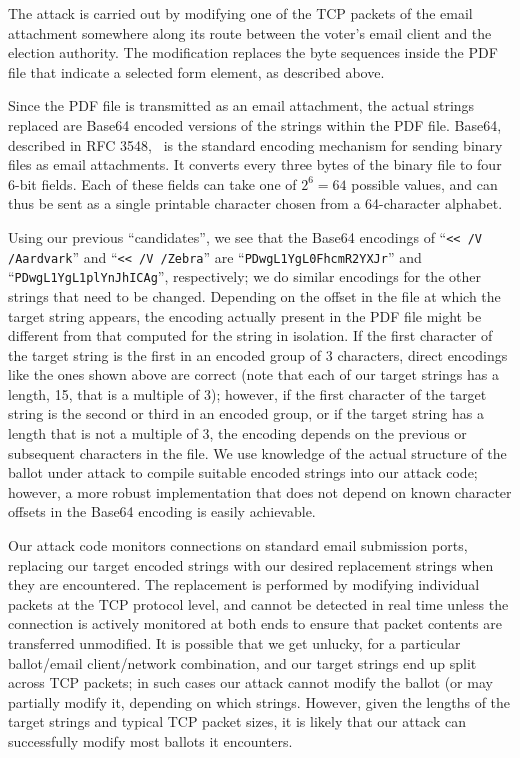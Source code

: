 \documentclass{article}
\begin{document}
The attack is carried out by modifying one of the TCP packets of the
email attachment somewhere along its route between the voter's email
client and the election authority. The modification replaces the byte
sequences inside the PDF file that indicate a selected form element,
as described above.

Since the PDF file is transmitted as an email attachment, the actual
strings replaced are Base64 encoded versions of the strings within the
PDF file. Base64, described in RFC 3548,~\cite{RFC3548} is the
standard encoding mechanism for sending binary files as email
attachments. It converts every three bytes of the binary file to four
6-bit fields. Each of these fields can take one of $2^6=64$ possible
values, and can thus be sent as a single printable character chosen
from a 64-character alphabet. 

Using our previous ``candidates'', we see that the Base64 encodings of
``\texttt{<{}< /V /Aardvark}'' and ``\texttt{<{}< /V
  /Zebra\textvisiblespace\textvisiblespace\textvisiblespace}'' are
``\texttt{PDwgL1YgL0FhcmR2YXJr}'' and
``\texttt{PDwgL1YgL1plYnJhICAg}'', respectively; we do similar
encodings for the other strings that need to be changed. Depending on
the offset in the file at which the target string appears, the
encoding actually present in the PDF file might be different from that
computed for the string in isolation. If the first character of the
target string is the first in an encoded group of 3 characters, direct
encodings like the ones shown above are correct (note that each of our
target strings has a length, 15, that is a multiple of 3); however, if
the first character of the target string is the second or third in an
encoded group, or if the target string has a length that is not a
multiple of 3, the encoding depends on the previous or subsequent
characters in the file. We use knowledge of the actual structure of
the ballot under attack to compile suitable encoded strings into our
attack code; however, a more robust implementation that does not
depend on known character offsets in the Base64 encoding is easily
achievable.

Our attack code monitors connections on standard email submission
ports, replacing our target encoded strings with our desired
replacement strings when they are encountered. The replacement is
performed by modifying individual packets at the TCP protocol level,
and cannot be detected in real time unless the connection is actively
monitored at both ends to ensure that packet contents are transferred
unmodified. It is possible that we get unlucky, for a particular
ballot/email client/network combination, and our target strings end up
split across TCP packets; in such cases our attack cannot modify the
ballot (or may partially modify it, depending on which
strings. However, given the lengths of the target strings and typical
TCP packet sizes, it is likely that our attack can successfully modify
most ballots it encounters.
\end{document}
